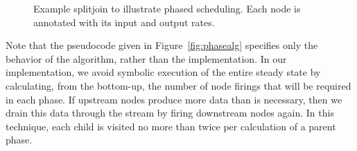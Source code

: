 \documentclass{sig-alt-full}
\begin{document}
\begin{figure*}[t]
\caption{{\small Example construction of phased schedules for the
splitjoin of Figure~\ref{fig:sjexlabel}.  First, execution is
simulated for one steady state according to a push schedule; the
stream graph is labeled with the number of items on each channel
following the firing of a shaded node.  Then, fine-grained phases are
formed that include executions of both the entry (A) and exit (D)
nodes.  Finally, the fine-grained phases are combined into
$\mt{maxPhases}$ phases, each of which is factored into a single
appearance schedule.  Note that buffer size increases with the
granularity of the phases, as shown at right.\protect\label{fig:sjex}}}
\vspace{-12pt}
\end{figure*}

\begin{figure}
\vspace{6pt}
\begin{minipage}{1.3in}
\begin{center}
\end{center}
\end{minipage}
\begin{minipage}{1.75in}
\caption{\small Example splitjoin to illustrate phased scheduling.
Each node is annotated with its input and output
rates.\protect\label{fig:sjexlabel}}
\end{minipage}
\vspace{-6pt}
\end{figure}


Note that the pseudocode given in Figure~\ref{fig:phasealg} specifies only
the behavior of the algorithm, rather than the implementation.  In our
implementation, we avoid symbolic execution of the entire steady state
by calculating, from the bottom-up, the number of node firings that
will be required in each phase.  If upstream nodes produce more data
than is necessary, then we drain this data through the stream by
firing downstream nodes again.  In this technique, each child is
visited no more than twice per calculation of a parent phase.
\end{document}
